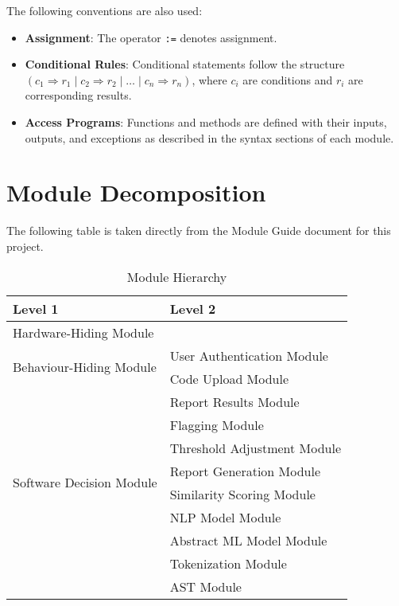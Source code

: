 \documentclass[12pt, titlepage]{article}
\begin{document}
\noindent
The following conventions are also used:
\begin{itemize}
    \item \textbf{Assignment}: The operator \texttt{:=} denotes assignment.
    \item \textbf{Conditional Rules}: Conditional statements follow the structure $(c_1 \Rightarrow r_1 \mid c_2 \Rightarrow r_2 \mid \ldots \mid c_n \Rightarrow r_n)$, where $c_i$ are conditions and $r_i$ are corresponding results.
    \item \textbf{Access Programs}: Functions and methods are defined with their inputs, outputs, and exceptions as described in the syntax sections of each module.
\end{itemize}

\section{Module Decomposition}

The following table is taken directly from the Module Guide document for this project.

\begin{table}[h!]
    \centering
    \begin{tabular}{p{} p{}}
    \toprule
    \textbf{Level 1} & \textbf{Level 2} \\
    \midrule
    {Hardware-Hiding Module} & ~ \\
    \midrule
    \multirow{2}{*}{Behaviour-Hiding Module} 
    & User Authentication Module \\
    & Code Upload Module \\
    & Report Results Module \\
    & Flagging Module \\
    & Threshold Adjustment Module \\
    \midrule
    \multirow{2}{*}{Software Decision Module} 
    & Report Generation Module \\
    & Similarity Scoring Module \\
    & NLP Model Module \\
    & Abstract ML Model Module \\
    & Tokenization Module \\
    & AST Module \\
   
    \bottomrule
    \end{tabular}
    \caption{Module Hierarchy}
    \label{TblMH}
  \end{table}
\newpage
~\newpage
\end{document}

